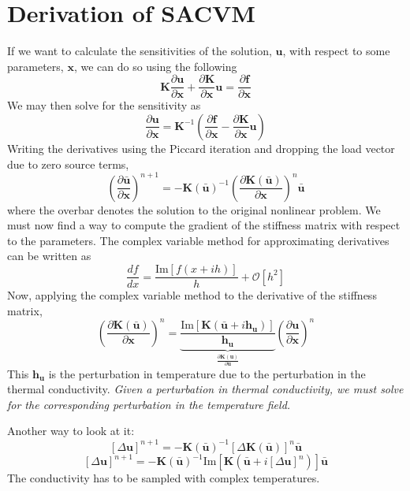 \documentclass{article}
\begin{document}
\section{Derivation of SACVM}
If we want to calculate the sensitivities of the solution, $\mathbf{u}$, with respect to some parameters, $\mathbf{x}$, we can do so using the following
\begin{equation}
  \mathbf{K} \frac{\partial \mathbf{u}}{\partial \mathbf{x}} + \frac{\partial \mathbf{K}}{\partial \mathbf{x}}\mathbf{u} = \frac{\partial \mathbf{f}}{\partial \mathbf{x}}
  \label{eq:14}
\end{equation}
We may then solve for the sensitivity as 
\begin{equation}
  \frac{\partial \mathbf{u}}{\partial\mathbf{x}} = \mathbf{K}^{-1}\left(\frac{\partial \mathbf{f}}{\partial \mathbf{x}} - \frac{\partial \mathbf{K}}{\partial \mathbf{x}} \mathbf{u} \right)
\end{equation}
Writing the derivatives using the Piccard iteration and dropping the load vector due to zero source terms,
\begin{equation}
  \left(\frac{\partial\mathbf{\bar{u}}}{\partial \mathbf{x}}\right)^{n+1} = - \mathbf{K}(\mathbf{\bar{u}})^{-1} \left(\frac{\partial \mathbf{K}(\mathbf{\bar{u}})}{\partial \mathbf{x}}\right)^n \mathbf{\bar{u}}
  \label{eq:piccard}
\end{equation}
where the overbar denotes the solution to the original nonlinear problem.  We must now find a way to compute the gradient of the stiffness matrix with respect to the parameters.  The complex variable method for approximating derivatives can be written as
\[
  \frac{df}{dx} = \frac{\text{Im}[f(x + ih)]}{h} + \mathcal{O}[h^2]
\]
Now, applying the complex variable method to the derivative of the stiffness matrix,
\begin{equation}
  \left(\frac{\partial \mathbf{K}(\mathbf{\bar{u}})}{\partial \mathbf{x}}\right)^n = \underbrace{\frac{\text{Im}\left[ \mathbf{K}(\mathbf{\bar{u}} + i \mathbf{h}_\mathbf{u})\right]}{\mathbf{h}_\mathbf{u}}}_{\displaystyle\frac{\partial \mathbf{K(u)}}{\partial\mathbf{u}}} \left(\frac{\partial \mathbf{u}}{\partial \mathbf{x}}\right)^n
\end{equation}
This $\mathbf{h_u}$ is the perturbation in temperature due to the perturbation in the thermal conductivity.  \emph{Given a perturbation in thermal conductivity, we must solve for the corresponding perturbation in the temperature field.}  

Another way to look at it:
\[
  \left[\Delta \mathbf{u}\right]^{n+1} = -\mathbf{K}(\mathbf{\bar{u}})^{-1} \left[\Delta \mathbf{K}(\mathbf{\bar{u}})\right]^{n} \mathbf{\bar{u}}
\]
\[
  [\Delta \mathbf{u}]^{n+1} = - \mathbf{K}(\mathbf{\bar{u}})^{-1} \text{Im}\left[\mathbf{K}(\mathbf{\bar{u}}+i[\Delta\mathbf{u}]^n)\right] \mathbf{\bar{u}}
\]
The conductivity has to be sampled with complex temperatures.  
\end{document}
